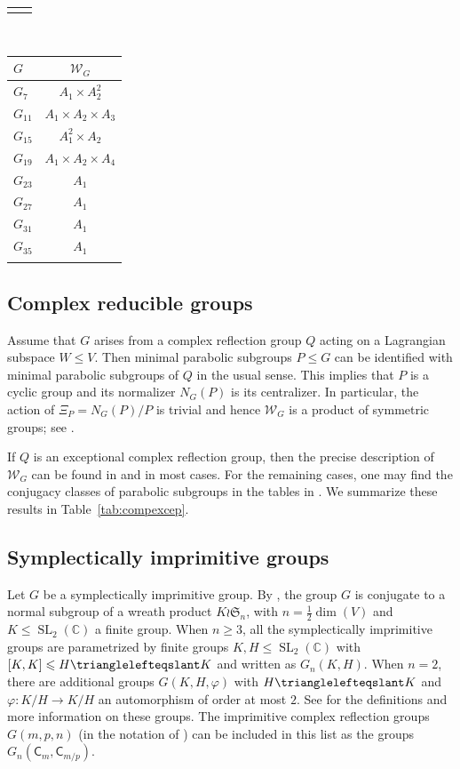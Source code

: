 \documentclass[a4paper]{amsart}
\theoremstyle{plain}
\theoremstyle{definition}
\theoremstyle{remark}
\DeclareMathOperator{\SL}{SL}
\newcommand{\CC}{\mathbb C}
\renewcommand{\phi}{\varphi}
\begin{document}
\begin{table}[h]
\begin{tabular}{|l|c|}
               &
  \end{tabular}~
  \begin{tabular}{|l|c|}
    \(G\)      & \(\mathcal W_G\) \\
    \hline
    \(G_7\)    & \(A_1\times A_2^2\) \\
    \(G_{11}\) & \(A_1\times A_2\times A_3\) \\
    \(G_{15}\) & \(A_1^2\times A_2\) \\
    \(G_{19}\) & \(A_1\times A_2\times A_4\)\\
    \(G_{23}\) & \(A_1\) \\
    \(G_{27}\) & \(A_1\) \\
    \(G_{31}\) & \(A_1\) \\
    \(G_{35}\) & \(A_1\) \\
               &
  \end{tabular}
\end{table}

\subsection{Complex reducible groups}
Assume that \(G\) arises from a complex reflection group \(Q\) acting on a Lagrangian subspace \(W\leqslant V\).
Then minimal parabolic subgroups \(P\leqslant G\) can be identified with minimal parabolic subgroups of \(Q\) in the usual sense.
This implies that \(P\) is a cyclic group and its normalizer \(N_G(P)\) is its centralizer. In particular, the action of $\Xi_P = N_G(P) / P$ is trivial and hence \(\mathcal W_G\) is a product of symmetric groups; see \cite[Lem.~4.1]{BST18}.

If \(Q\) is an exceptional complex reflection group, then the precise description of \(\mathcal W_G\) can be found in \cite[Lem.~7.3]{BST18} and \cite[Tab.~1]{BST18} in most cases. For the remaining cases, one may find the conjugacy classes of parabolic subgroups in the tables in \cite[App.~C]{OT92}. We summarize these results in Table~\ref{tab:compexcep}.

\subsection{Symplectically imprimitive groups}
Let \(G\) be a symplectically imprimitive group. By \cite{Coh80}, the group \(G\) is conjugate to a normal subgroup of a wreath product \(K\wr \mathfrak S_n\), with \(n = \frac{1}{2}\dim(V)\) and \(K\leqslant \SL_2(\CC)\) a finite group.
When $n \geqslant 3$, all the symplectically imprimitive groups are parametrized by finite groups \(K, H\leqslant\SL_2(\CC)\) with \([K, K] \leqslant H\trianglelefteqslant K\) and written as \(G_n(K, H)\).
When \(n = 2\), there are additional groups \(G(K, H, \phi)\) with \(H\trianglelefteqslant K\) and \(\phi:K/H\to K/H\) an automorphism of order at most $2$.
See \cite{Coh80, Tay25, Wal25} for the definitions and more information on these groups.
The imprimitive complex reflection groups \(G(m, p, n)\) (in the notation of \cite{ST54}) can be included in this list as the groups \(G_n(\mathsf C_m, \mathsf C_{m/p})\).
\end{document}
